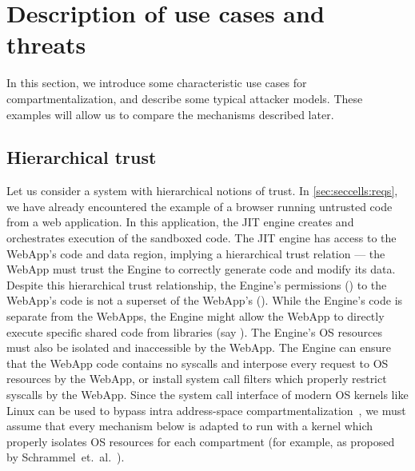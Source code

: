 

\section{Description of use cases and threats}
\label{sec:compreview:usecases}
In this section, we introduce some characteristic use cases for 
compartmentalization, and 
describe some typical attacker models.
These examples will allow us to compare the mechanisms described later.

\subsection{Hierarchical trust} 
\label{sec:compreview:usecases:hierarchical}
Let us consider a system with hierarchical notions of trust.
In \autoref{sec:seccells:reqs}, we have already encountered the example of
a browser running untrusted code from a web application.
In this application, the JIT engine creates and orchestrates execution of
the sandboxed code.
The JIT engine has access to the WebApp's code and data region, implying
a hierarchical trust relation ---
the WebApp must trust the Engine to correctly generate code and modify
its data.
Despite this hierarchical trust relationship, 
the Engine's permissions () to the WebApp's code is not a
superset of the WebApp's ().
While the Engine's code is separate from the WebApps, the Engine might allow
the WebApp to directly execute specific shared code from 
libraries (say ).
The Engine's OS resources must also be isolated and inaccessible by the
WebApp.
The Engine can ensure that the WebApp code contains no syscalls and interpose
every request to OS resources by the WebApp, or install system call filters
which properly restrict syscalls by the WebApp.
Since the system call interface of modern OS kernels like Linux can be used to 
bypass intra address-space compartmentalization~\cite{ConnorMSS20}, we must
assume that every mechanism below is adapted to run with a kernel which
properly isolates OS resources for each compartment (for example, as proposed 
by Schrammel~et.~al.~\cite{schrammel2022jenny}).


